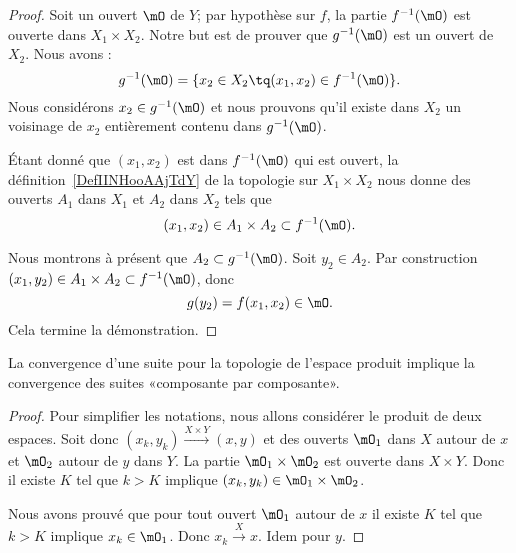 \begin{proof}
    Soit un ouvert \( \mO\) de \( Y\); par hypothèse sur \( f\), la partie \( f^{-1}(\mO)\) est ouverte dans \( X_1\times X_2\). Notre but est de prouver que \( g^{-1}(\mO)\) est un ouvert de \( X_2\). Nous avons :
    \begin{equation}
        g^{-1}(\mO)=\{ x_2\in X_2\tq (x_1,x_2)\in f^{-1}(\mO) \}.
    \end{equation}
    Nous considérons \( x_2\in g^{-1}(\mO)\) et nous prouvons qu'il existe dans \( X_2\) un voisinage de \( x_2\) entièrement contenu dans \( g^{-1}(\mO)\).

    Étant donné que \( (x_1,x_2)\) est dans \( f^{-1}(\mO)\) qui est ouvert, la définition~\ref{DefIINHooAAjTdY} de la topologie sur \( X_1\times X_2\) nous donne des ouverts \( A_1\) dans \( X_1\) et \( A_2\) dans \( X_2\) tels que
    \begin{equation}
        (x_1,x_2)\in A_1\times A_2\subset f^{-1}(\mO).
    \end{equation}

    Nous montrons à présent que \( A_2\subset g^{-1}(\mO)\). Soit \( y_2\in A_2\). Par construction \( (x_1,y_2)\in A_1\times A_2\subset f^{-1}(\mO)\), donc
    \begin{equation}
        g(y_2)=f(x_1,x_2)\in \mO.
    \end{equation}
    Cela termine la démonstration.
\end{proof}

\begin{proposition}      \label{PROPooNRRIooCPesgO}
    La convergence d'une suite pour la topologie de l'espace produit implique la convergence des suites «composante par composante».
\end{proposition}

\begin{proof}
    Pour simplifier les notations, nous allons considérer le produit de deux espaces. Soit donc \( (x_k,y_k)\stackrel{X\times Y}{\longrightarrow}(x,y)\) et des ouverts \( \mO_1\) dans \( X\) autour de \( x\) et \( \mO_2\) autour de \( y\) dans \( Y\). La partie \( \mO_1\times \mO_2\) est ouverte dans \( X\times Y\). Donc il existe \( K\) tel que \( k>K\) implique \( (x_k,y_k)\in \mO_1\times \mO_2\).

    Nous avons prouvé que pour tout ouvert \( \mO_1\) autour de \( x\) il existe \( K\) tel que \( k>K\) implique \( x_k\in \mO_1\). Donc \( x_k\stackrel{X}{\longrightarrow}x\). Idem pour \( y\).
\end{proof}

